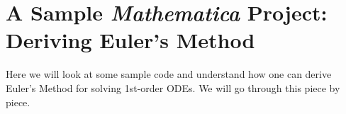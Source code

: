 \chapter[Deriving Euler's Method]{A Sample \emph{Mathematica} Project: Deriving Euler's Method}

Here we will look at some sample code and understand how one can derive Euler's Method for solving 1st-order ODEs. We will go through this piece by piece.
